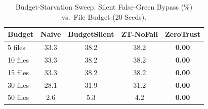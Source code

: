 \begin{table}[t]
\centering
\caption{Budget-Starvation Sweep: Silent False-Green Bypass (\%) vs.\ File Budget (20 Seeds).}
\label{tab:hpg_budget}
\begin{tabular}{lcccc}
\toprule
\textbf{Budget} & \textbf{Naive} & \textbf{BudgetSilent} & \textbf{ZT-NoFail} & \textbf{ZeroTrust} \\
\midrule
5 files & 33.3 & 38.2 & 38.2 & \textbf{0.00} \\
10 files & 33.3 & 38.2 & 38.2 & \textbf{0.00} \\
15 files & 33.3 & 38.2 & 38.2 & \textbf{0.00} \\
30 files & 28.1 & 31.9 & 31.2 & \textbf{0.00} \\
50 files & 2.6 & 5.3 & 4.2 & \textbf{0.00} \\
\bottomrule
\end{tabular}
\end{table}
